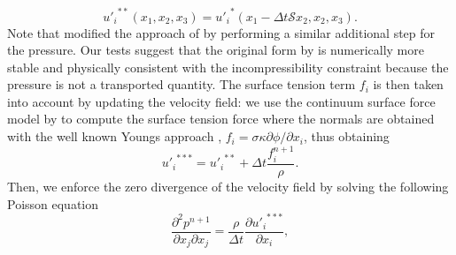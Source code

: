 \begin{equation}
{u'_i}^{**} \left( x_1, x_2, x_3 \right) = {u'_i}^* \left( x_1 - \Delta t \mathcal{S} x_2, x_2, x_3 \right).
\end{equation}
Note that \cite{tanaka_2017a} modified the approach of \cite{gerz_schumann_elghobashi_1989a} by performing a similar additional step for the pressure. Our tests suggest that the original form by \cite{gerz_schumann_elghobashi_1989a} is numerically more stable and physically consistent with the incompressibility constraint because the pressure is not a transported quantity. The surface tension term $f_i$ is then taken into account by updating the velocity field: we use the continuum surface force model by \cite{brackbill_kothe_zemach_1992a} to compute the surface tension force where the normals are obtained with the well known Youngs approach \citep{youngs_1982a}, \ie $f_i= \sigma \kappa \partial \phi/\partial x_i$, thus obtaining
\begin{equation}
{u'_i}^{***} = {u'_i}^{**} + \Delta t \frac{f_i^{n+1}}{\rho}.
\end{equation}
Then, we enforce the zero divergence of the velocity field by solving the following Poisson equation
\begin{equation}
\label{eq:poisson}
\frac{\partial^2 p^{n+1}}{\partial x_j \partial x_j} = \frac{\rho}{\Delta t} \frac{\partial {u'_i}^{***}}{\partial x_i},
\end{equation}
